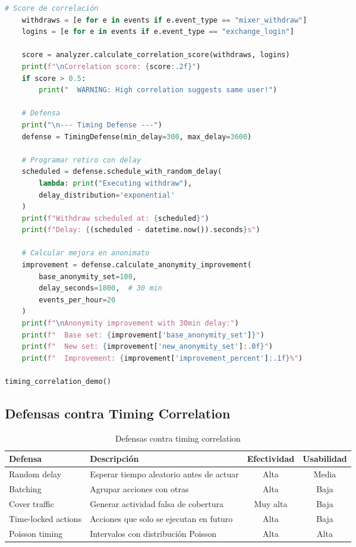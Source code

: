 \documentclass[11pt,a4paper,twoside]{book}
\theoremstyle{definition}
\theoremstyle{remark}
\begin{document}
\begin{lstlisting}[language=Python, caption={Sistema de análisis y defensa contra timing correlation}]
    # Score de correlación
    withdraws = [e for e in events if e.event_type == "mixer_withdraw"]
    logins = [e for e in events if e.event_type == "exchange_login"]
    
    score = analyzer.calculate_correlation_score(withdraws, logins)
    print(f"\nCorrelation score: {score:.2f}")
    if score > 0.5:
        print("  WARNING: High correlation suggests same user!")
    
    # Defensa
    print("\n--- Timing Defense ---")
    defense = TimingDefense(min_delay=300, max_delay=3600)
    
    # Programar retiro con delay
    scheduled = defense.schedule_with_random_delay(
        lambda: print("Executing withdraw"),
        delay_distribution='exponential'
    )
    print(f"Withdraw scheduled at: {scheduled}")
    print(f"Delay: {(scheduled - datetime.now()).seconds}s")
    
    # Calcular mejora en anonimato
    improvement = defense.calculate_anonymity_improvement(
        base_anonymity_set=100,
        delay_seconds=1800,  # 30 min
        events_per_hour=20
    )
    print(f"\nAnonymity improvement with 30min delay:")
    print(f"  Base set: {improvement['base_anonymity_set']}")
    print(f"  New set: {improvement['new_anonymity_set']:.0f}")
    print(f"  Improvement: {improvement['improvement_percent']:.1f}%")

timing_correlation_demo()
\end{lstlisting}

\subsection{Defensas contra Timing Correlation}

\begin{table}[htbp]
\centering
\small
\begin{tabular}{lp{4cm}cc}
\toprule
\textbf{Defensa} & \textbf{Descripción} & \textbf{Efectividad} & \textbf{Usabilidad} \\
\midrule
Random delay & Esperar tiempo aleatorio antes de actuar & Alta & Media \\
Batching & Agrupar acciones con otras & Alta & Baja \\
Cover traffic & Generar actividad falsa de cobertura & Muy alta & Baja \\
Time-locked actions & Acciones que solo se ejecutan en futuro & Alta & Baja \\
Poisson timing & Intervalos con distribución Poisson & Alta & Alta \\
\bottomrule
\end{tabular}
\caption{Defensas contra timing correlation}
\end{table}
\end{document}
